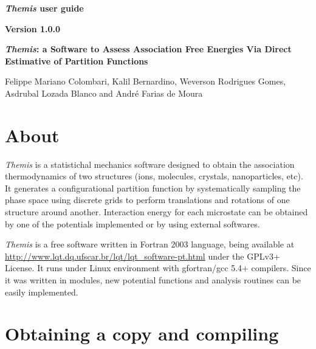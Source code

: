 \documentclass[10pt,a4paper]{report}
\begin{document}
\begin{center}

  \vfill

  \textbf{\Huge{\textit{Themis} user guide}}

  \vfill

  \textbf{\Large{Version 1.0.0}}
  
  \vfill

\end{center}

\newpage

\begin{center}
  
  \vfill

  \noindent

  \textbf{\Large{\textit{Themis}: a Software to Assess Association Free Energies Via Direct Estimative of Partition Functions}}

  \vfill

  {Felippe Mariano Colombari}, {Kalil Bernardino}, {Weverson Rodrigues Gomes}, {Asdrubal Lozada Blanco} and
  {Andr\'e Farias de Moura} 

  \vfill

\end{center}

\newpage

\chapter{About}

  \textit{Themis} is a statistichal mechanics software designed to obtain the 
association thermodynamics of two structures (ions, molecules, crystals, 
nanoparticles, etc). It generates a configurational partition function by 
systematically sampling the phase space using discrete grids to perform 
translations and rotations of one structure around another. Interaction energy 
for each microstate can be obtained by one of the potentials implemented or 
by using external softwares.

  \textit{Themis} is a free software written in Fortran 2003 language, being 
available at \url{http://www.lqt.dq.ufscar.br/lqt/lqt_software-pt.html} under 
the GPLv3+ License. It runs under Linux environment with gfortran/gcc 5.4+ 
compilers. Since it was written in modules, new potential functions and analysis 
routines can be easily implemented.

\clearpage

\chapter{Obtaining a copy and compiling}
\end{document}
